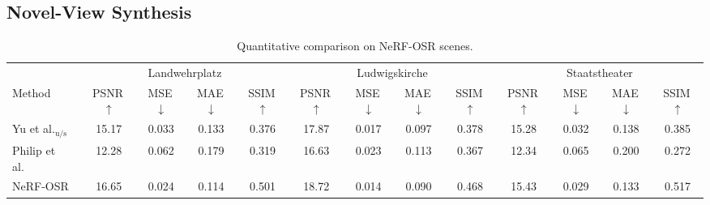 \subsection{Novel-View Synthesis}

\begin{table}[!tb]
    \centering
    \captionsetup{font=scriptsize}
    \caption{Quantitative comparison on NeRF-OSR scenes.}
    \vspace{0.8em}
    \label{tab:nvs}
    \setlength{\tabcolsep}{2pt}
    \scriptsize
    \begin{tabular}{l cccc cccc cccc}
        \toprule
                                                      & \multicolumn{4}{c}{Landwehrplatz} & \multicolumn{4}{c}{Ludwigskirche} & \multicolumn{4}{c}{Staatstheater}                                                                                                                                                            \\
        \cmidrule(lr){2-5} \cmidrule(lr){6-9} \cmidrule(lr){10-13}
        Method                                        & PSNR\,$\uparrow$                  & MSE\,$\downarrow$                 & MAE\,$\downarrow$                 & SSIM\,$\uparrow$
                                                      & PSNR\,$\uparrow$                  & MSE\,$\downarrow$                 & MAE\,$\downarrow$                 & SSIM\,$\uparrow$
                                                      & PSNR\,$\uparrow$                  & MSE\,$\downarrow$                 & MAE\,$\downarrow$                 & SSIM\,$\uparrow$                                                                                                                                         \\
        \midrule
        Yu et al.$_{\text{u/s}}$~\cite{yu2021outdoor} & 15.17                             & 0.033                             & 0.133                             & 0.376            & 17.87          & 0.017          & 0.097          & 0.378          & 15.28          & 0.032          & 0.138          & 0.385          \\
        Philip et al.~\cite{philip2019multiview}      & 12.28                             & 0.062                             & 0.179                             & 0.319            & 16.63          & 0.023          & 0.113          & 0.367          & 12.34          & 0.065          & 0.200          & 0.272          \\
        NeRF-OSR~\cite{rudnev2022nerfOSR}             & 16.65                             & 0.024                             & 0.114                             & 0.501            & 18.72          & 0.014          & 0.090          & 0.468          & 15.43          & 0.029          & 0.133          & 0.517          \\

\end{tabular}
\end{table}
